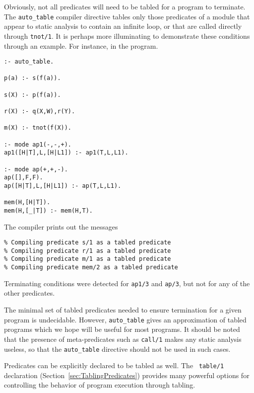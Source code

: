 Obviously, not all predicates will need to be tabled for a program to
terminate.  The {\tt auto\_table} compiler directive tables only those
predicates of a module that appear to static analysis to contain an
infinite loop, or that are called directly through {\tt tnot/1}.  It
is perhaps more illuminating to demonstrate these conditions through
an example.  For instance, in the program.

\begin{center}
\begin{verbatim}
:- auto_table. 

p(a) :- s(f(a)). 

s(X) :- p(f(a)).

r(X) :- q(X,W),r(Y).

m(X) :- tnot(f(X)).

:- mode ap1(-,-,+).
ap1([H|T],L,[H|L1]) :- ap1(T,L,L1).

:- mode ap(+,+,-).
ap([],F,F).
ap([H|T],L,[H|L1]) :- ap(T,L,L1).

mem(H,[H|T]).
mem(H,[_|T]) :- mem(H,T).
\end{verbatim}
\end{center}

\noindent
The compiler prints out the messages
\begin{verbatim}
% Compiling predicate s/1 as a tabled predicate
% Compiling predicate r/1 as a tabled predicate
% Compiling predicate m/1 as a tabled predicate
% Compiling predicate mem/2 as a tabled predicate
\end{verbatim}

Terminating conditions were detected for {\tt ap1/3} and {\tt ap/3}, but
not for any of the other predicates.

The minimal set of tabled predicates needed to ensure termination for
a given program is undecidable.  However, {\tt auto\_table} gives an
approximation of tabled programs which we hope will be useful for most
programs.   It should be noted that the presence of meta-predicates
such as {\tt call/1} makes any static analysis useless, so that the
{\tt auto\_table} directive should not be used in such cases.

Predicates can be explicitly declared to be tabled as well. The {\tt
  table/1} declaration (Section~\ref{sec:TablingPredicates}) provides
many powerful options for controlling the behavior of program
execution through tabling.

